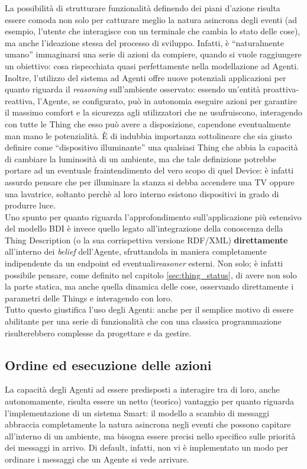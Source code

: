 \documentclass[12pt,a4paper,openright,oneside]{report}
\newcommand{\quotes}[1]{``#1''}
\begin{document}
La possibilità di strutturare funzionalità definendo dei piani d'azione risulta essere comoda non solo per catturare meglio la natura asincrona degli eventi (ad esempio, l'utente che interagisce con un terminale che cambia lo stato delle cose), ma anche l'ideazione stessa del processo di sviluppo. Infatti, è \quotes{naturalmente umano} immaginarsi una serie di azioni da compiere, quando si vuole raggiungere un obiettivo: cosa rispecchiata quasi perfettamente nella modellazione ad Agenti.\\

Inoltre, l'utilizzo del sistema ad Agenti offre nuove potenziali applicazioni per quanto riguarda il \textit{reasoning} sull'ambiente osservato: essendo un'entità proattiva-reattiva, l'Agente, se configurato, può in autonomia eseguire azioni per garantire il massimo comfort e la sicurezza agli utilizzatori che ne usufruiscono, interagendo con tutte le Thing che esso può avere a disposizione, capendone eventualmente man mano le potenzialità. È di indubbia importanza sottolineare che sia giusto definire come \quotes{dispositivo illuminante} una qualsiasi Thing che abbia la capacità di cambiare la luminosità di un ambiente, ma che tale definizione potrebbe portare ad un eventuale fraintendimento del vero scopo di quel Device: è infatti assurdo pensare che per illuminare la stanza si debba accendere una TV oppure una lavatrice, soltanto perchè al loro interno esistono dispositivi in grado di produrre luce.\\

Uno spunto per quanto riguarda l'approfondimento sull'applicazione più estensivo del modello BDI è invece quello legato all'integrazione della conoscenza della Thing Description (o la sua corrispettiva versione RDF/XML) \textbf{direttamente} all'interno dei \textit{belief} dell'Agente, sfruttandola in maniera completamente indipendente da un endpoint ed eventuali\textit{reasoner} esterni. Non solo; è infatti possibile pensare, come definito nel capitolo \ref{sec:thing_status}, di avere non solo la parte statica, ma anche quella dinamica delle cose, osservando direttamente i parametri delle Things e interagendo con loro.\\

Tutto questo giustifica l'uso degli Agenti: anche per il semplice motivo di essere abilitante per una serie di funzionalità che con una classica programmazione risulterebbero complesse da progettare e da gestire.\\


\subsection{Ordine ed esecuzione delle azioni}
La capacità degli Agenti ad essere predisposti a interagire tra di loro, anche autonomamente, risulta essere un netto (teorico) vantaggio per quanto riguarda l'implementazione di un sistema Smart: il modello a scambio di messaggi abbraccia completamente la natura asincrona negli eventi che possono capitare all'interno di un ambiente, ma bisogna essere precisi nello specifico sulle priorità dei messaggi in arrivo. Di default, infatti, non vi è implementato un modo per ordinare i messaggi che un Agente si vede arrivare.\\
\end{document}
